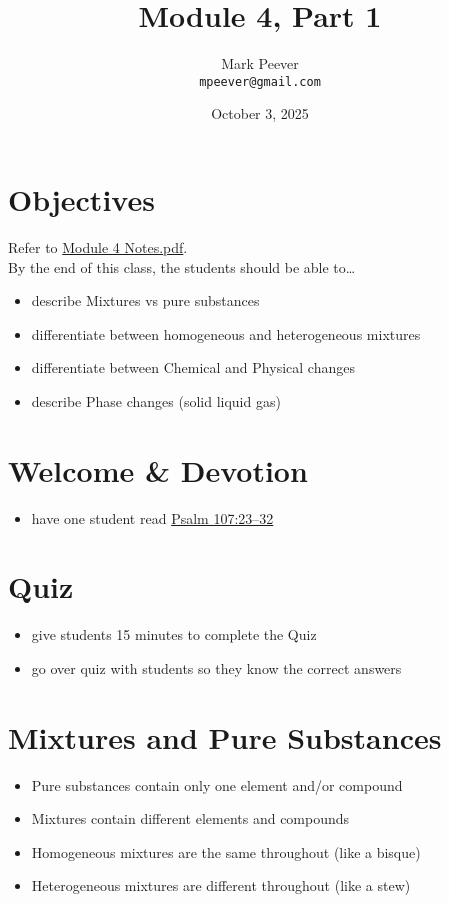 \documentclass[10pt, oneside]{article}   	%
\title{Module 4, Part 1}
\author{Mark Peever\\ \texttt{mpeever@gmail.com}}
\date{October 3, 2025}
\begin{document}
\maketitle

\section*{Objectives}
Refer to \href{https://drive.google.com/file/d/1-HTy9W-cQOkNabdz7FzxH-j4LVV51c--/view?usp=sharing}{Module 4 Notes.pdf}.\\

By the end of this class, the students should be able to\ldots
\begin{itemize}
\item describe Mixtures vs pure substances
\item differentiate between homogeneous and heterogeneous mixtures
\item differentiate between Chemical and Physical changes
\item describe Phase changes (solid \ce{<=>} liquid \ce{<=>} gas)
\end{itemize}

\section*{Welcome \& Devotion}
\begin{itemize}
\item have one student read \href{https://www.biblegateway.com/passage/?search=psalm\%20107\&version=LSB}{Psalm 107:23--32}
\end{itemize}

\section*{Quiz}
\begin{itemize}
\item give students 15 minutes to complete the Quiz
\item go over quiz with students so they know the correct answers
\end{itemize}

\section*{Mixtures and Pure Substances}
\begin{itemize}
\item Pure substances contain only one element and/or compound
\item Mixtures contain different elements and compounds
\item Homogeneous mixtures are the same throughout (like a bisque)
\item Heterogeneous mixtures are different throughout (like a stew)
\end{itemize}
\end{document}
